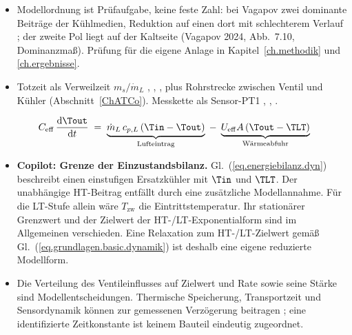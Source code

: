 \begin{itemize}
    Rate ist die Dynamik zeitvariant; ein zeitinvariantes lineares Glied wäre
    eine Zusatzannahme.
  \item Modellordnung ist Prüfaufgabe, keine feste Zahl: bei Vagapov zwei
    dominante Beiträge der Kühlmedien, Reduktion auf einen dort mit schlechterem
    Verlauf \cite[Abschn.~5.2, Gl.~43]{vagapovDynamicModelTemperature2022}; der
    zweite Pol liegt auf der Kaltseite (Vagapov 2024, Abb.~7.10, Dominanzmaß).
    Prüfung für die eigene Anlage in Kapitel~\ref{ch.methodik} und
    \ref{ch.ergebnisse}.
  \item Totzeit als Verweilzeit $m_s/\dot m_L$
    \cite[Gl.~41]{vagapovDynamicModelTemperature2022},
    \cite[S.~3257]{yinAnalyticModelTransient2003},
    \cite[Gl.~31.57]{almbauerThermomanagement2019},
    \cite[Gl.~2.173]{guzzellaIntroductionModelingControl2010} plus Rohrstrecke
    zwischen Ventil und Kühler (Abschnitt~\ref{ChATCo}). Messkette als
    Sensor-PT1 \cite[Gl.~4.6.42]{isermannEngineModelingControl2014},
    \cite[Tab.~7.6]{erikssonModelingControlEngines2014},
    \cite[Gl.~17]{mrosekParameterEstimationPhysical2009}.
\end{itemize}

\begin{equation}
  \label{eq.energiebilanz.dyn}
  C_{\mathrm{eff}}\,\frac{\mathrm{d}\Tout}{\mathrm{d}t}
  \;=\;
  \underbrace{\dot m_L\,c_{p,L}\,(\Tin - \Tout)}_{\text{Lufteintrag}}
  \;-\;
  \underbrace{U_{\mathrm{eff}}A\,(\Tout - \TLT)}_{\text{Wärmeabfuhr}}
\end{equation}

\begin{itemize}
  \item \textbf{Copilot: Grenze der Einzustandsbilanz.}
    Gl.~(\ref{eq.energiebilanz.dyn}) beschreibt einen einstufigen
    Ersatzkühler mit $\Tin$ und $\TLT$. Der unabhängige HT-Beitrag
    entfällt durch eine zusätzliche Modellannahme.
    Für die LT-Stufe allein wäre $T_{\mathrm{zw}}$ die Eintrittstemperatur.
    Ihr stationärer Grenzwert und der Zielwert der HT-/LT-Exponentialform
    sind im Allgemeinen verschieden. Eine Relaxation zum
    HT-/LT-Zielwert gemäß Gl.~(\ref{eq.grundlagen.basic.dynamik})
    ist deshalb eine eigene reduzierte Modellform.
  \item Die Verteilung des Ventileinflusses auf Zielwert und Rate sowie
    seine Stärke sind Modellentscheidungen. Thermische Speicherung,
    Transportzeit und Sensordynamik können zur gemessenen Verzögerung
    beitragen \cite[S.~230 und 237--238]{isermannEngineModelingControl2014};
    eine identifizierte Zeitkonstante ist keinem Bauteil eindeutig zugeordnet.
\end{itemize}

